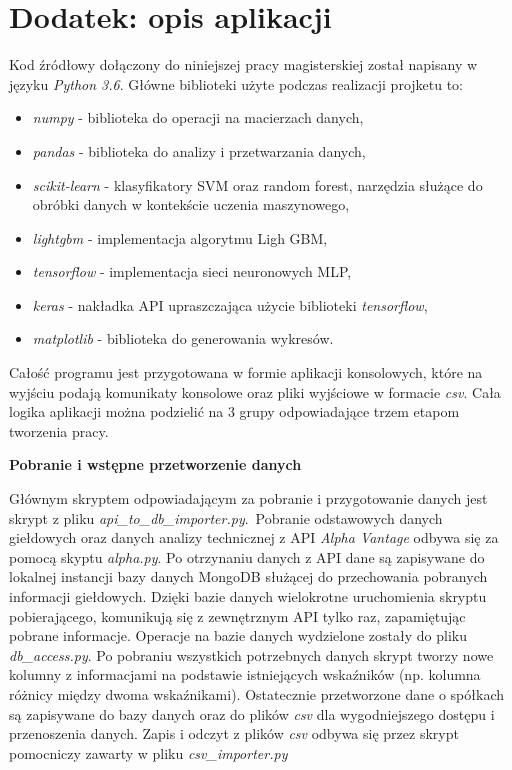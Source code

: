 \documentclass[a4paper, twoside, 11pt, openright]{article}
\begin{document}

\section*{Dodatek: opis aplikacji}


Kod źródłowy dołączony do niniejszej pracy magisterskiej został napisany w języku \textit{Python 3.6}. Główne biblioteki użyte podczas realizacji projketu to:
\begin{itemize}
    \item \textit{numpy} - biblioteka do operacji na macierzach danych,
    \item \textit{pandas} - biblioteka do analizy i przetwarzania danych,
    \item \textit{scikit-learn} - klasyfikatory SVM oraz random forest, narzędzia służące do obróbki danych w kontekście uczenia maszynowego,
    \item \textit{lightgbm} - implementacja algorytmu Ligh GBM,
    \item \textit{tensorflow} - implementacja sieci neuronowych MLP,
    \item \textit{keras} - nakładka API upraszczająca użycie biblioteki \textit{tensorflow},
    \item \textit{matplotlib} - biblioteka do generowania wykresów.
\end{itemize}

Całość programu jest przygotowana w formie aplikacji konsolowych, które na wyjściu podają komunikaty konsolowe oraz pliki wyjściowe w formacie \textit{csv}. Cała logika aplikacji można podzielić na 3 grupy odpowiadające trzem etapom tworzenia pracy.

\bigskip

\textbf{Pobranie i wstępne przetworzenie danych}

Głównym skryptem odpowiadającym za pobranie i przygotowanie danych jest skrypt z pliku \textit{api\_to\_db\_importer.py}.~Pobranie odstawowych danych giełdowych oraz danych analizy technicznej z API \textit{Alpha Vantage} \cite{alphavantage} odbywa się za pomocą skyptu \textit{alpha.py}. Po otrzynaniu danych z API dane są zapisywane do lokalnej instancji bazy danych MongoDB służącej do przechowania pobranych informacji giełdowych. Dzięki bazie danych wielokrotne uruchomienia skryptu pobierającego, komunikują się z zewnętrznym API tylko raz, zapamiętując pobrane informacje. Operacje na bazie danych wydzielone zostały do pliku \textit{db\_access.py}. Po pobraniu wszystkich potrzebnych danych skrypt tworzy nowe kolumny z informacjami na podstawie istniejących wskaźników (np. kolumna różnicy między dwoma wskaźnikami). Ostatecznie przetworzone dane o spółkach są zapisywane do bazy danych oraz do plików \textit{csv} dla wygodniejszego dostępu i przenoszenia danych. Zapis i odczyt z plików \textit{csv} odbywa się przez skrypt pomocniczy zawarty w pliku \textit{csv\_importer.py}
\end{document}
